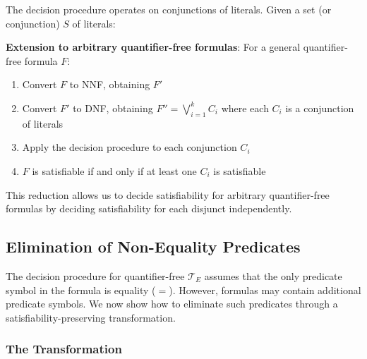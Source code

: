 \documentclass[11pt,a4paper]{article}
\theoremstyle{definition}
\theoremstyle{plain}
\theoremstyle{remark}
\begin{document}
The decision procedure operates on conjunctions of literals. Given a set (or conjunction) $S$ of literals:

\begin{center}
\end{center}

\textbf{Extension to arbitrary quantifier-free formulas}: For a general quantifier-free formula $F$:
\begin{enumerate}
    \item Convert $F$ to NNF, obtaining $F'$
    \item Convert $F'$ to DNF, obtaining $F'' = \bigvee_{i=1}^{k} C_i$ where each $C_i$ is a conjunction of literals
    \item Apply the decision procedure to each conjunction $C_i$
    \item $F$ is satisfiable if and only if at least one $C_i$ is satisfiable
\end{enumerate}

This reduction allows us to decide satisfiability for arbitrary quantifier-free formulas by deciding satisfiability for each disjunct independently.

\subsection{Elimination of Non-Equality Predicates}

The decision procedure for quantifier-free $\mathcal{T}_E$ assumes that the only predicate symbol in the formula is equality ($=$). However, formulas may contain additional predicate symbols. We now show how to eliminate such predicates through a satisfiability-preserving transformation.

\subsubsection{The Transformation}
\end{document}
